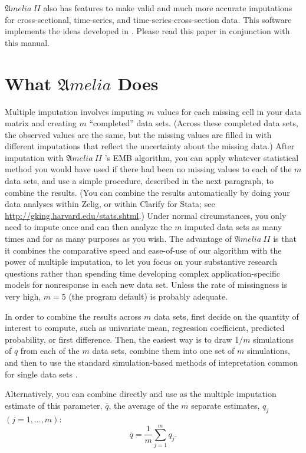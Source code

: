 \documentclass[12pt,titlepage]{article}
\newcommand{\AmeliaII}{\ensuremath{\mathfrak Amelia~II} }
\begin{document}
\AmeliaII also has features to make valid and much more accurate
imputations for cross-sectional, time-series, and
time-series-cross-section data.  This software implements the ideas
developed in \citet*{HonKin06}.  Please read this paper in conjunction
with this manual.

\section{What ${\mathfrak Amelia}$ Does}
\label{sec:what}

Multiple imputation involves imputing $m$ values for each missing cell
in your data matrix and creating $m$ ``completed'' data sets.  (Across
these completed data sets, the observed values are the same, but the
missing values are filled in with different imputations that reflect
the uncertainty about the missing data.)  After imputation with
\AmeliaII's EMB algorithm, you can apply whatever statistical method
you would have used if there had been no missing values to each of the
$m$ data sets, and use a simple procedure, described in the next
paragraph, to combine the results.  (You can combine the results
automatically by doing your data analyses within Zelig, or within
Clarify for Stata; see \url{http://gking.harvard.edu/stats.shtml}.)
Under normal circumstances, you only need to impute once and can then
analyze the $m$ imputed data sets as many times and for as many
purposes as you wish.  The advantage of \AmeliaII is that it combines
the comparative speed and ease-of-use of our algorithm with the power
of multiple imputation, to let you focus on your substantive research
questions rather than spending time developing complex
application-specific models for nonresponse in each new data set.
Unless the rate of missingness is very high, $m = 5$ (the program
default) is probably adequate.

In order to combine the results across $m$ data sets, first decide on
the quantity of interest to compute, such as univariate mean,
regression coefficient, predicted probability, or first difference.
Then, the easiest way is to draw $1/m$ simulations of $q$ from each of
the $m$ data sets, combine them into one set of $m$ simulations, and
then to use the standard simulation-based methods of intepretation
common for single data sets \citep{KinTomWit00}.

Alternatively, you can combine directly and use as the multiple
imputation estimate of this parameter, $\bar{q}$, the average of the
$m$ separate estimates, $q_j$ $(j=1,...,m)$:
\begin{equation}
  \bar{q}=\frac{1}{m}\sum^{m}_{j=1}q_j.  
\end{equation}
\end{document}
